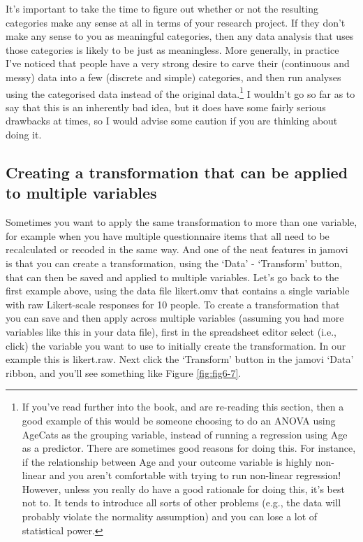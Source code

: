 \documentclass[
]{book}
\begin{document}
It's important to take the time to figure out whether or not the resulting categories make any sense at all in terms of your research project. If they don't make any sense to you as meaningful categories, then any data analysis that uses those categories is likely to be just as meaningless. More generally, in practice I've noticed that people have a very strong desire to carve their (continuous and messy) data into a few (discrete and simple) categories, and then run analyses using the categorised data instead of the original data.\footnote{If you've read further into the book, and are re-reading this section, then a good example of this would be someone choosing to do an ANOVA using AgeCats as the grouping variable, instead of running a regression using Age as a predictor. There are sometimes good reasons for doing this. For instance, if the relationship between Age and your outcome variable is highly non-linear and you aren't comfortable with trying to run non-linear regression! However, unless you really do have a good rationale for doing this, it's best not to. It tends to introduce all sorts of other problems (e.g., the data will probably violate the normality assumption) and you can lose a lot of statistical power.} I wouldn't go so far as to say that this is an inherently bad idea, but it does have some fairly serious drawbacks at times, so I would advise some caution if you are thinking about doing it.

\hypertarget{creating-a-transformation-that-can-be-applied-to-multiple-variables}{%
\subsection{Creating a transformation that can be applied to multiple variables}\label{creating-a-transformation-that-can-be-applied-to-multiple-variables}}

Sometimes you want to apply the same transformation to more than one variable, for example when you have multiple questionnaire items that all need to be recalculated or recoded in the same way. And one of the neat features in jamovi is that you can create a transformation, using the `Data' - `Transform' button, that can then be saved and applied to multiple variables. Let's go back to the first example above, using the data file likert.omv that contains a single variable with raw Likert-scale responses for 10 people. To create a transformation that you can save and then apply across multiple variables (assuming you had more variables like this in your data file), first in the spreadsheet editor select (i.e., click) the variable you want to use to initially create the transformation. In our example this is likert.raw. Next click the `Transform' button in the jamovi `Data' ribbon, and you'll see something like Figure \ref{fig:fig6-7}.
\end{document}
